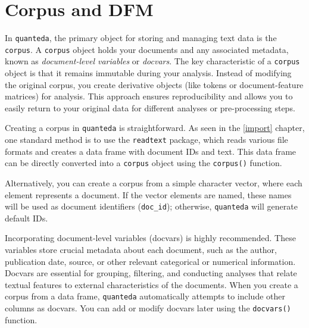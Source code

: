 \documentclass[
]{book}
\begin{document}
\section{Corpus and DFM}\label{corpus-and-dfm}

In \texttt{quanteda}, the primary object for storing and managing text data is the \texttt{corpus}. A \texttt{corpus} object holds your documents and any associated metadata, known as \emph{document-level variables} or \emph{docvars}. The key characteristic of a \texttt{corpus} object is that it remains immutable during your analysis. Instead of modifying the original corpus, you create derivative objects (like tokens or document-feature matrices) for analysis. This approach ensures reproducibility and allows you to easily return to your original data for different analyses or pre-processing steps.

Creating a corpus in \texttt{quanteda} is straightforward. As seen in the \ref{import} chapter, one standard method is to use the \texttt{readtext} package, which reads various file formats and creates a data frame with document IDs and text. This data frame can be directly converted into a \texttt{corpus} object using the \texttt{corpus()} function.

Alternatively, you can create a corpus from a simple character vector, where each element represents a document. If the vector elements are named, these names will be used as document identifiers (\texttt{doc\_id}); otherwise, \texttt{quanteda} will generate default IDs.

Incorporating document-level variables (docvars) is highly recommended. These variables store crucial metadata about each document, such as the author, publication date, source, or other relevant categorical or numerical information. Docvars are essential for grouping, filtering, and conducting analyses that relate textual features to external characteristics of the documents. When you create a corpus from a data frame, \texttt{quanteda} automatically attempts to include other columns as docvars. You can add or modify docvars later using the \texttt{docvars()} function.
\end{document}
